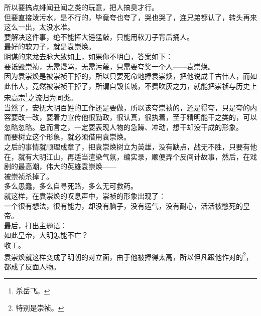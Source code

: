 \begin{multicols}{\theparacolNo}
所以要搞点绯闻丑闻之类的玩意，把人搞臭才行。\\

但要直接泼污水，是不行的，毕竟夸也夸了，哭也哭了，连兄弟都认了，转头再来这么一出，太没水准。\\

要解决这件事，绝不能挥大锤猛敲，只能用软刀子背后捅人。\\

最好的软刀子，就是袁崇焕。\\

阴谋的来龙去脉大致如上，如果你不明白，答案如下：\\

要诋毁崇祯，无需谩骂，无需污蔑，只需要夸奖一个人——袁崇焕。\\

因为袁崇焕是被崇祯干掉的，所以只要死命地捧袁崇焕，把他说成千古伟人，而如此伟人，竟然被崇祯干掉了，所谓自毁长城，不费吹灰之力，就能把崇祯与历史上宋高宗\footnote{杀岳飞。}之流归为同类。\\

当然了，安抚大明百姓的工作还是要做，所以该夸崇祯的，还是得夸，只是夸的内容要改一改，要着力宣传他很勤政，很认真，很执着，至于精明能干之类的，可以忽略忽略。总而言之，一定要表现人物的急躁、冲动，想干却没干成的形象。\\

而要树立这个形象，就必须借用袁崇焕。\\

之后的事情就顺理成章了，把袁崇焕树立为英雄，没有缺点，战无不胜，只要有他在，就有大明江山，再适当渲染气氛，编实录，顺便弄个反间计故事，然后，在戏剧的最高潮，伟大的英雄袁崇焕——\\

被崇祯杀掉了。\\

多么愚蠢，多么自寻死路，多么无可救药。\\

就这样，在袁崇焕的叹息声中，崇祯的形象出现了：\\

一个很有想法，很有能力，却没有脑子，没有运气，没有耐心，活活被憋死的皇帝。\\

最后，打出主题语：\\

如此皇帝，大明怎能不亡？\\

收工。\\

袁崇焕就这样变成了明朝的对立面，由于他被捧得太高，所以但凡跟他作对的\footnote{特别是崇祯。}，都成了反面人物。\\


\end{multicols}
